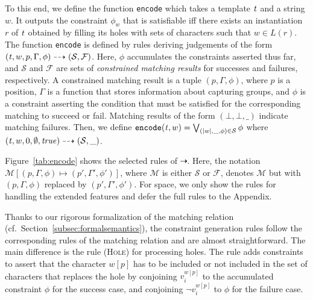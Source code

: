 \documentclass[conference]{IEEEtran}
\newcommand{\sstate}{{\it t}}
\newcommand{\encode}{\dashrightarrow}
\newcommand{\supplementary}{Appendix} \newcommand{\Supplementary}{Appendix} \newtheorem{definition}{Definition}[section]
\begin{document}
To this end, we define the function {\tt encode} which takes a template $\sstate$ and a string $w$.  It outputs the constraint $\phi_w$ that is satisfiable iff there exists an instantiation $r$ of $\sstate$ obtained by filling its holes with sets of characters such that $w \in L(r)$.  
The function {\tt encode} is defined by rules deriving judgements of the form $(\sstate, w, p, \Gamma, \phi) \encode (\mathcal{S}, \mathcal{F})$.  Here, $\phi$ accumulates the constraints asserted thus far, and $\mathcal{S}$ and $\mathcal{F}$ are sets of {\em constrained matching results} for successes and failures, respectively. A constrained matching result is a tuple $(p, \Gamma, \phi)$, where $p$ is a position, $\Gamma$ is a function that stores information about capturing groups, and $\phi$ is a constraint asserting the condition that must be satisfied for the corresponding matching to succeed or fail.  Matching results of the form $(\bot,\bot,\_)$ indicate matching failures.  Then, 
we define ${\tt encode}(\sstate, w) = \bigvee_{(|w|, \_, \phi) \in \mathcal{S} } \phi$ where
$(\sstate, w, 0, \emptyset, \mathit{true}) \encode (\mathcal{S}, \_)$.

Figure~\ref{tab:encode} shows the selected rules of $\encode$.  Here, the notation $\mathcal{M}[(p, \Gamma, \phi) \mapsto (p', \Gamma', \phi')]$, where $\mathcal{M}$ is either $\mathcal{S}$ or $\mathcal{F}$, denotes $\mathcal{M}$ but with $(p,\Gamma, \phi)$ replaced by $(p', \Gamma', \phi')$. For space, we only show the rules for handling the extended features and defer the full rules to the \supplementary{}.


Thanks to our rigorous formalization of the matching relation (cf.~Section~\ref{subsec:formalsemantics}), the constraint generation rules follow the corresponding rules of the matching relation and are almost straightforward.
The main difference is the rule (\textsc{Hole}) for processing holes.  The rule adds constraints to assert that the character $w[p]$ has to be included or not included in the set of characters that replaces the hole by conjoining $v_i^{w[p]}$ to the accumulated constraint $\phi$ for the success case, and conjoining $\neg v_i^{w[p]}$ to $\phi$ for the failure case.
\end{document}
